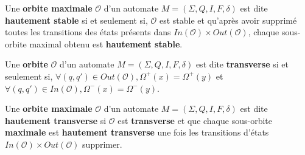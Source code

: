 \begin{Definition}
  Une \textbf{orbite maximale} \(\mathcal{O}\) d'un automate \(M = (\Sigma, Q, 
  I, F, \delta)\) est dite \textbf{hautement stable} si et seulement si, 
  \(\mathcal{O}\) est stable et qu’après avoir supprimé toutes les transitions 
  des états présents dans \(In(\mathcal{O}) \times Out(\mathcal{O})\), chaque 
  sous-orbite maximal obtenu est \textbf{hautement stable}.
\end{Definition}

\begin{Definition}
  Une \textbf{orbite} \(\mathcal{O}\) d'un automate \(M = (\Sigma, Q, I, F, 
  \delta)\) est dite \textbf{transverse} si et seulement si, \(\forall (q, q') 
  \in Out(\mathcal{O}), \Omega^{+}(x) = \Omega^{+}(y)\) et \(\forall (q, q') \in 
  In(\mathcal{O}), \Omega^{-}(x) = \Omega^{-}(y)\).
\end{Definition}

\begin{Definition}
  Une \textbf{orbite maximale} \(\mathcal{O}\) d'un automate \(M = (\Sigma, Q, 
  I, F, \delta)\) est dite \textbf{hautement transverse} si \(\mathcal{O}\) est 
  \textbf{transverse} et que chaque sous-orbite \textbf{maximale} est 
  \textbf{hautement transverse} une fois les transitions d'états 
  \(In(\mathcal{O}) \times Out(\mathcal{O})\) supprimer.
\end{Definition}